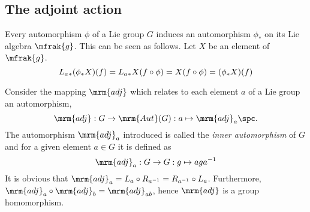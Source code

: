\documentclass[10pt,reqno]{amsart}
\numberwithin{equation}{section}
\begin{document}

\subsection{The adjoint action}

Every automorphism $\phi$ of a Lie group $G$ induces an 
automorphism $\phi_\ast$ on its Lie algebra $\mfrak{g}$. This can 
be seen as follows.  Let $X$ be an element of $\mfrak{g}$.
%
\begin{displaymath}
	L_a{}_\ast (\phi_\ast X)(f) = L_a{}_\ast X(f\circ \phi) \\
		= X(f\circ \phi) = (\phi_\ast X) (f)
\end{displaymath}
%

Consider the mapping $\mrm{adj}$ which relates to each element 
$a$ of a Lie group an automorphism,
%
\begin{equation}
	\mrm{adj} : G \rightarrow \mrm{Aut}(G) : a \mapsto
	\mrm{adj}_a \spc.
\end{equation}
%
The automorphism $\mrm{adj}_a$ introduced is called the 
\emph{inner automorphism} of $G$ and for a given element $a \in 
G$ it is defined as
%
\begin{equation}
	\mrm{adj}_a : G \rightarrow G : g \mapsto a g a^{-1}
\end{equation}
%
It is obvious that $\mrm{adj}_a = L_a \circ R_{a^{-1}} = 
R_{a^{-1}} \circ L_a$. Furthermore, $\mrm{adj}_a \circ 
\mrm{adj}_b = \mrm{adj}_{ab}$, hence $\mrm{adj}$ is a group 
homomorphism.
\end{document}

